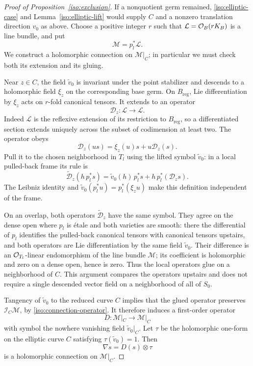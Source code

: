 \begin{proof}[Proof of Proposition~\ref{iso:exclusion}]
If a nonquotient germ remained, \eqref{iso:elliptic-case} and
Lemma~\ref{iso:elliptic-lift} would supply \(C\) and a nonzero
translation direction \(v_0\) as above.
Choose a positive integer \(r\) such that
\(\mathcal L=\mathcal O_B(rK_B)\) is a line bundle, and put
\[
                         \mathcal M=p_l^*\mathcal L.
\]
We construct a holomorphic connection on \(\mathcal M|_C\);
in particular we must check both its extension and its gluing.

Near \(z\in C\), the field \(\widetilde v_0\) is invariant under
the point stabilizer and descends to a holomorphic field
\(\xi_z\) on the corresponding base germ.
On \(B_{\mathrm{reg}}\), Lie differentiation by \(\xi_z\) acts
on \(r\)-fold canonical tensors.  It extends to an operator
\[
             \mathcal D_z:\mathcal L\longrightarrow\mathcal L.
\]
Indeed \(\mathcal L\) is the reflexive extension of its restriction
to \(B_{\mathrm{reg}}\), so a differentiated section extends
uniquely across the subset of codimension at least two.
The operator obeys
\[
             \mathcal D_z(us)
                    =\xi_z(u)s+u\mathcal D_z(s).
\]
Pull it to the chosen neighborhood in \(T_l\) using the lifted
symbol \(\widetilde v_0\): in a local pulled-back frame its rule is
\begin{equation}\label{iso:connection-operator}
 \widetilde{\mathcal D}_z(h\,p_l^*s)
       =\widetilde v_0(h)\,p_l^*s
                   +h\,p_l^*(\mathcal D_zs).
\end{equation}
The Leibniz identity and
\(\widetilde v_0(p_l^*u)=p_l^*(\xi_z u)\)
make this definition independent of the frame.

On an overlap, both operators
\(\widetilde{\mathcal D}_z\) have the same symbol.
They agree on the dense open where \(p_l\) is \'{e}tale and
both varieties are smooth: there the differential of \(p_l\)
identifies the pulled-back canonical tensors with canonical
tensors upstairs, and both operators are Lie differentiation
by the same field \(\widetilde v_0\).
Their difference is an \(\mathcal O_{T_l}\)-linear endomorphism of the
line bundle \(\mathcal M\); its coefficient is holomorphic and
zero on a dense open, hence is zero.
Thus the local operators glue on a neighborhood of \(C\).
This argument compares the operators upstairs and does not
require a single descended vector field on a neighborhood of
all of \(S_0\).

Tangency of \(\widetilde v_0\) to the reduced curve \(C\) implies
that the glued operator preserves
\(\mathcal I_C\mathcal M\), by
\eqref{iso:connection-operator}.
It therefore induces a first-order operator
\[
             D:\mathcal M|_C\longrightarrow\mathcal M|_C
\]
with symbol the nowhere vanishing field
\(\widetilde v_0|_C\).
Let \(\tau\) be the holomorphic one-form on the elliptic curve
\(C\) satisfying \(\tau(\widetilde v_0)=1\).
Then
\[
                           \nabla s=D(s)\otimes\tau
\]
is a holomorphic connection on \(\mathcal M|_C\).


\end{proof}
